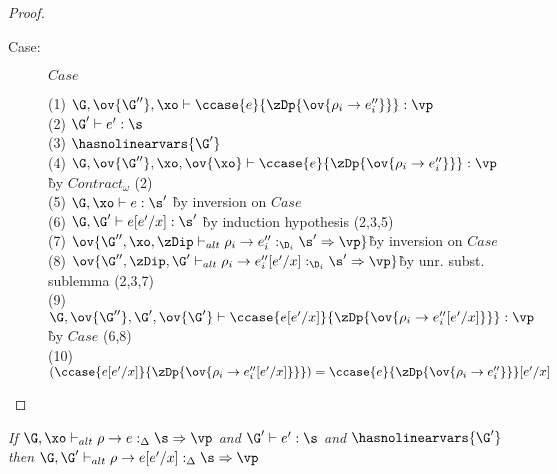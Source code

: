 \begin{proof}
\begin{description}
\item[Case:] $Case$
\begin{tabbing}
    (1) $\G, \ov{\G''}, \xo \vdash \ccase{e}{\zDp \{\ov{\rho_i \to e''_i}\}} : \vp$\\
    (2) $\G' \vdash e' : \s$\\
    (3) $\hasnolinearvars{\G'}$\\
    (4) $\G, \ov{\G''}, \xo, \ov{\xo} \vdash \ccase{e}{\zDp \{\ov{\rho_i \to
    e''_i}\}} : \vp$ \` by $Contract_\omega$ (2)\\
    (5) $\G, \xo \vdash e : \s'$ \` by inversion on $Case$\\
    (6) $\G, \G' \vdash e[e'/x] : \s'$ \` by induction hypothesis (2,3,5)\\
    (7) $\ov{\G'', \xo, \zDip \vdash_{alt} \rho_i \to e''_i :_{\D_i} \s'
    \Rightarrow \vp}$\` by inversion on $Case$\\
    (8) $\ov{\G'', \zDip, \G' \vdash_{alt} \rho_i \to e''_i[e'/x] :_{\D_i} \s'
    \Rightarrow \vp}$\` by unr. subst. sublemma (2,3,7)\\
    (9) $\G, \ov{\G''}, \G', \ov{\G'} \vdash \ccase{e[e'/x]}{\zDp \{\ov{\rho_i \to
    e''_i[e'/x]}\}} : \vp$\` by $Case$ (6,8)\\
    (10) $(\ccase{e[e'/x]}{\zDp \{\ov{\rho_i \to
    e''_i[e'/x]}\}}) = \ccase{e}{\zDp \{\ov{\rho_i \to e''_i}\}}[e'/x]$\\
\end{tabbing}
\end{description}

\end{proof}

\begin{sublemma}
\emph{If $\G, \xo \vdash_{alt} \rho \to e :_\Delta \s \Rightarrow \vp$ and $\G' \vdash e' : \s$ and
    $\hasnolinearvars{\G'}$ then $\G, \G' \vdash_{alt} \rho \to e[e'/x] :_\Delta \s \Rightarrow \vp$}
\end{sublemma}

